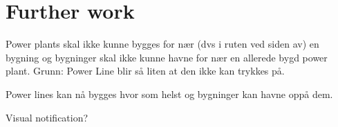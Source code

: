 \section{Further work}


Power plants skal ikke kunne bygges for nær (dvs i ruten ved siden av) en bygning og bygninger skal ikke kunne havne for nær en allerede bygd power plant. Grunn: Power Line blir så liten at den ikke kan trykkes på.

Power lines kan nå bygges hvor som helst og bygninger kan havne oppå dem.

Visual notification?